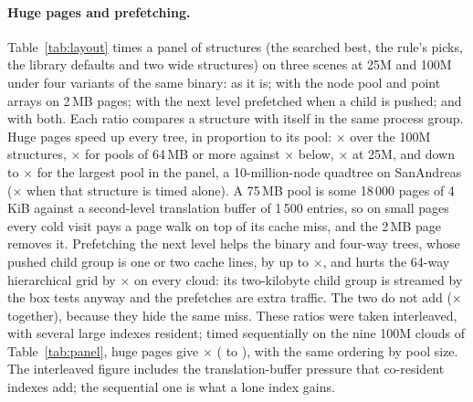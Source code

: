 \paragraph{Huge pages and prefetching.} Table~\ref{tab:layout} times a panel of structures (the searched best, the rule's picks, the library defaults and two wide structures) on three scenes at 25M and 100M under four variants of the same binary: as it is; with the node pool and point arrays on 2\,MB pages; with the next level prefetched when a child is pushed; and with both. Each ratio compares a structure with itself in the same process group. Huge pages speed up every tree, in proportion to its pool: \hugeSinglesHundredM$\times$ over the 100M structures, \hugeBigPools$\times$ for pools of 64\,MB or more against \hugeSmallPools$\times$ below, \hugeSinglesTwentyFiveM$\times$ at 25M, and down to \hugeMin$\times$ for the largest pool in the panel, a 10-million-node quadtree on SanAndreas (\hugeAloneQt$\times$ when that structure is timed alone). A 75\,MB pool is some 18\,000 pages of 4\,KiB against a second-level translation buffer of 1\,500 entries, so on small pages every cold visit pays a page walk on top of its cache miss, and the 2\,MB page removes it. Prefetching the next level helps the binary and four-way trees, whose pushed child group is one or two cache lines, by up to \prefetchMin$\times$, and hurts the 64-way hierarchical grid by \prefetchHGrid$\times$ on every cloud: its two-kilobyte child group is streamed by the box tests anyway and the prefetches are extra traffic. The two do not add (\bothSinglesHundredM$\times$ together), because they hide the same miss. These ratios were taken interleaved, with several large indexes resident; timed sequentially on the nine 100M clouds of Table~\ref{tab:panel}, huge pages give \panelHugeOverBaseSingles$\times$ (\panelHugeOverBaseSinglesMin{} to \panelHugeOverBaseSinglesMax), with the same ordering by pool size. The interleaved figure includes the translation-buffer pressure that co-resident indexes add; the sequential one is what a lone index gains.

\begin{table}[t]
\centering\footnotesize
\caption{Layout variants over the unchanged binary, geometric mean (range) of per-structure latency ratios (below 1: the variant is faster), three scenes at 25M and 100M, interleaved in rotated process groups. Pools are the hot-node arrays at 32 bytes per node; the last row is the 64-way hierarchical grid and the variants built on it.}
\label{tab:layout}

\end{table}

